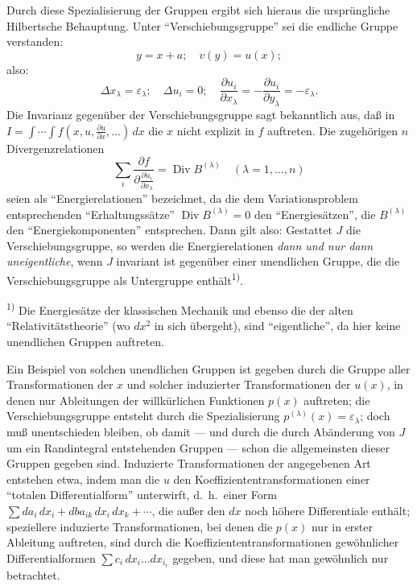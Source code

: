\documentclass[12pt,a4paper]{article}
\begin{document}
Durch diese Spezialisierung der Gruppen ergibt sich hieraus die urspr\"ungliche Hilbertsche Behauptung. Unter ``Verschiebungsgruppe'' sei die endliche Gruppe verstanden:
\[
y=x+a;\quad v(y)=u(x);
\]
also:
\[
\Delta x_{\lambda}=\varepsilon_{\lambda};\quad\Delta u_{i}=0;\quad\frac{\partial u_{i}}{\partial x_{\lambda}}=-\frac{\partial u_{i}}{\partial y_{\lambda}}=-\varepsilon_{\lambda}.
\]
Die Invarianz gegen\"uber der Verschiebungsgruppe sagt bekanntlich aus, da\ss{} in $I=\int\cdots\int f(x,u,\tfrac{\partial u}{\partial x},\ldots)\,dx$ die $x$ nicht explizit in $f$ auftreten. Die zugeh\"origen $n$ Divergenzrelationen
\[
\sum_{i}\frac{\partial f}{\partial\tfrac{\partial u_{i}}{\partial x_{\lambda}}}=\operatorname{Div}B^{(\lambda)}\quad(\lambda=1,\ldots,n)
\]
seien als ``Energierelationen'' bezeichnet, da die dem Variationsproblem entsprechenden ``Erhaltungss\"atze'' $\operatorname{Div}B^{(\lambda)}=0$ den ``Energies\"atzen'', die $B^{(\lambda)}$ den ``Energiekomponenten'' entsprechen. Dann gilt also: Gestattet $J$ die Verschiebungsgruppe, so werden die Energierelationen \emph{dann und nur dann uneigentliche}, wenn $J$ invariant ist gegen\"uber einer unendlichen Gruppe, die die Verschiebungsgruppe als Untergruppe enth\"alt\textsuperscript{1)}.

\smallskip
\noindent\textsuperscript{1)} Die Energies\"atze der klassischen Mechanik und ebenso die der alten ``Relativit\"atstheorie'' (wo $dx^{2}$ in sich \"ubergeht), sind ``eigentliche'', da hier keine unendlichen Gruppen auftreten.

Ein Beispiel von solchen unendlichen Gruppen ist gegeben durch die Gruppe aller Transformationen der $x$ und solcher induzierter Transformationen der $u(x)$, in denen nur Ableitungen der willk\"urlichen Funktionen $p(x)$ auftreten; die Verschiebungsgruppe entsteht durch die Spezialisierung $p^{(\lambda)}(x)=\varepsilon_{\lambda}$; doch mu\ss{} unentschieden bleiben, ob damit --- und durch die durch Ab\"anderung von $J$ um ein Randintegral entstehenden Gruppen --- schon die allgemeinsten dieser Gruppen gegeben sind. Induzierte Transformationen der angegebenen Art entstehen etwa, indem man die $u$ den Koeffiziententransformationen einer ``totalen Differentialform'' unterwirft, d.\ h.\ einer Form $\sum da_{i}\,dx_{i}+dba_{ik}\,dx_{i}\,dx_{k}+\cdots$, die au\ss{}er den $dx$ noch h\"ohere Differentiale enth\"alt; speziellere induzierte Transformationen, bei denen die $p(x)$ nur in erster Ableitung auftreten, sind durch die Koeffiziententransformationen gew\"ohnlicher Differentialformen $\sum c_{i}\,dx_{i}\ldots dx_{i_{r}}$ gegeben, und diese hat man gew\"ohnlich nur betrachtet.
\end{document}
